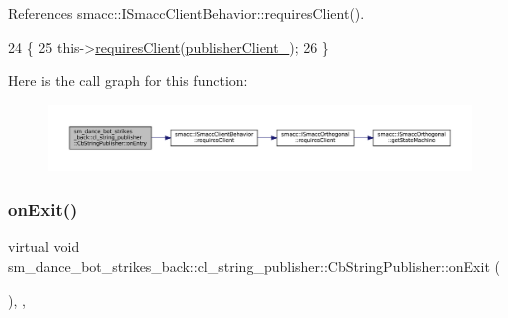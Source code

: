 References smacc\+::\+I\+Smacc\+Client\+Behavior\+::requires\+Client().


\begin{DoxyCode}
24     \{
25         this->\hyperlink{classsmacc_1_1ISmaccClientBehavior_a32b16e99e3b4cb289414203dc861a440}{requiresClient}(\hyperlink{classsm__dance__bot__strikes__back_1_1cl__string__publisher_1_1CbStringPublisher_afdbdb3c725b013af9f30fc04d7ab458b}{publisherClient\_});
26     \}
\end{DoxyCode}
Here is the call graph for this function\+:
\nopagebreak
\begin{figure}[H]
\begin{center}
\leavevmode
\includegraphics[width=350pt]{classsm__dance__bot__strikes__back_1_1cl__string__publisher_1_1CbStringPublisher_a2c3963143fe180a5e5f939362857d2e0_cgraph}
\end{center}
\end{figure}
\mbox{\label{classsm__dance__bot__strikes__back_1_1cl__string__publisher_1_1CbStringPublisher_ae4aa02553119822c583bb2abb44c810c}} 
\subsubsection{\texorpdfstring{on\+Exit()}{onExit()}}
{\footnotesize\ttfamily virtual void sm\+\_\+dance\+\_\+bot\+\_\+strikes\+\_\+back\+::cl\+\_\+string\+\_\+publisher\+::\+Cb\+String\+Publisher\+::on\+Exit (\begin{DoxyParamCaption}{ }\end{DoxyParamCaption})\hspace{0.3cm}{\ttfamily [inline]}, {\ttfamily [override]}, {\ttfamily [virtual]}}



